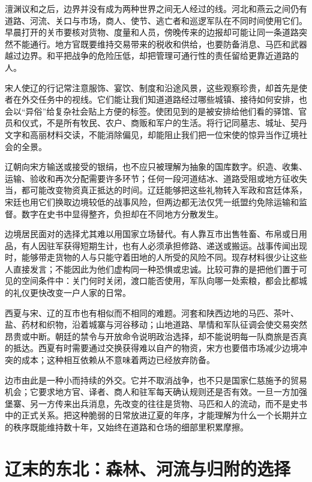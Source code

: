 澶渊议和之后，边界并没有成为两种世界之间无人经过的线。河北和燕云之间仍有道路、河流、关口与市场，商人、使节、逃亡者和巡逻军队在不同时间使用它们。早晨打开的关市要核对货物、度量和人员，傍晚传来的边报却可能让同一条道路突然不能通行。地方官既要维持交易带来的税收和供给，也要防备消息、马匹和武器越过边界。和平把战争的危险压低，却把管理可通行性的责任留给更靠近道路的人。

宋人使辽的行记常注意服饰、宴饮、制度和沿途风景，这些观察珍贵，却首先是使者在外交任务中的视线。它们能让我们知道道路经过哪些城镇、接待如何安排，也会以“异俗”给复杂社会贴上方便的标签。使团见到的是被安排给他们看的驿馆、官员和仪式，不是所有牧民、农户、商贩和军户的生活。将行记同墓志、城址、契丹文字和高丽材料交读，不能消除偏见，却能阻止我们把一位宋使的惊异当作辽境社会的全景。

辽朝向宋方输送或接受的银绢，也不应只被理解为抽象的国库数字。织造、收集、运输、验收和再次分配需要许多环节；任何一段河道结冰、道路受阻或地方征收失当，都可能改变物资真正抵达的时间。辽廷能够把这些礼物转入军政和宫廷体系，宋廷也用它们换取边境较低的战事风险，但两边都无法仅凭一纸盟约免除运输和监督。数字在史书中显得整齐，负担却在不同地方分散发生。

边境居民面对的选择尤其难以用国家立场替代。有人靠互市出售牲畜、布帛或日用品，有人因驻军获得短期生计，也有人必须承担修路、递送或搬运。战事传闻出现时，能够带走货物的人与只能守着田地的人所受的风险不同。现存材料很少让这些人直接发言；不能因此为他们虚构同一种恐惧或忠诚。比较可靠的是把他们置于可见的空间条件中：关门何时关闭，渡口能否使用，军队向哪一处索粮，都会比都城的礼仪更快改变一户人家的日常。

西夏与宋、辽的互市也有相似而不相同的难题。河套和陕西边地的马匹、茶叶、盐、药材和织物，沿着城寨与河谷移动；山地道路、旱情和军队征调会使交易突然昂贵或中断。朝廷的禁令与开放命令说明政治选择，却不能说明每一队商旅是否真的抵达。西夏有时需要通过交换获得难以自产的物资，宋方也要借市场减少边境冲突的成本；这种相互依赖从不意味着两边已经放弃防备。

边市由此是一种小而持续的外交。它并不取消战争，也不只是国家仁慈施予的贸易机会；它要求地方官、译者、商人和驻军每天确认规则还是否有效。一旦一方加强堡寨、另一方传来出兵消息，先改变的往往是货物、马匹和人的流动，而不是史书中的正式关系。把这种脆弱的日常放进辽夏的年序，才能理解为什么一个长期并立的秩序既能维持数十年，又始终在道路和仓场的细部里积累摩擦。

\section{辽末的东北：森林、河流与归附的选择}

